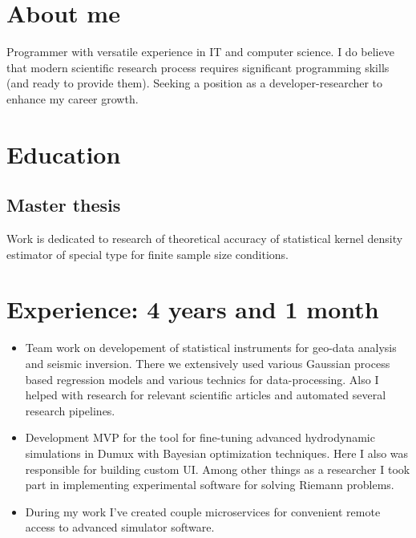 \documentclass[12pt,a4paper]{moderncv}
\begin{document}
\makecvtitle

\section{About me}
Programmer with versatile experience in IT and computer science.
I do believe that modern scientific research process requires significant programming skills (and ready to provide them).
Seeking a position as a developer-researcher to enhance my career growth.

\section{Education}

\subsection{Master thesis}
Work is dedicated to research of theoretical accuracy of statistical kernel density estimator of special type for finite sample size conditions.

\section{Experience: 4 years and 1 month}
\begin{itemize}
\item Team work on developement of statistical instruments for geo-data analysis and seismic inversion. There we extensively used various Gaussian process based regression models and various technics for data-processing. Also I helped with research for relevant scientific articles and automated several research pipelines. \newline

\item Development MVP for the tool for fine-tuning advanced hydrodynamic simulations in Dumux with Bayesian optimization techniques. Here I also was responsible for building custom UI.
Among other things as a researcher I took part in implementing experimental software for solving Riemann problems. \newline

\item During my work I've created couple microservices for convenient remote access to advanced simulator software. \newline

\end{itemize}
\end{document}
